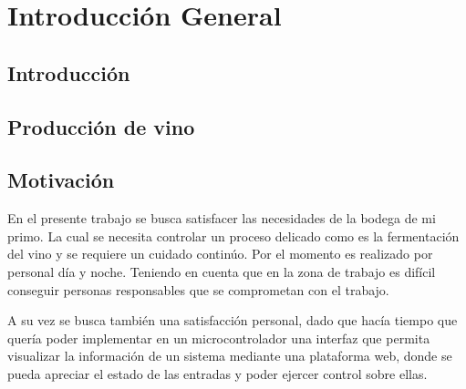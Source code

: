 
\chapter{Introducción General} %

\label{Chapter1} %
\label{IntroGeneral}


\newcommand{\keyword}[1]{\textbf{#1}}
\newcommand{\tabhead}[1]{\textbf{#1}}
\newcommand{\code}[1]{\texttt{#1}}
\newcommand{\file}[1]{\texttt{\bfseries#1}}
\newcommand{\option}[1]{\texttt{\itshape#1}}
\newcommand{\grados}{$^{\circ}$}


\section{Introducción}


\section{Producción de vino}


\section{Motivación}

En el presente trabajo se busca satisfacer las necesidades de la bodega de mi primo. La cual se necesita controlar un proceso delicado como es la fermentación del vino y se requiere un cuidado continúo. Por el momento es realizado por personal día y noche. Teniendo en cuenta que en la zona de trabajo es difícil conseguir personas responsables que se comprometan con el trabajo. 

A su vez se busca también una satisfacción personal, dado que hacía tiempo que quería poder implementar en un microcontrolador una interfaz que permita visualizar la información de un sistema mediante una plataforma web, donde se pueda apreciar el estado de las entradas y poder ejercer control sobre ellas.

